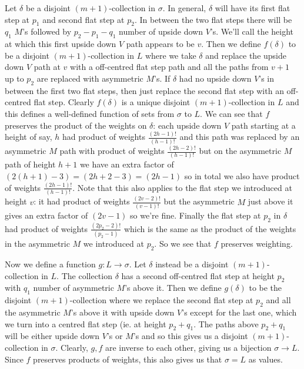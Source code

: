 \documentclass[11pt]{article}
\theoremstyle{definition}
\theoremstyle{definition}
\theoremstyle{plain}
\theoremstyle{plain}
\theoremstyle{plain}
\theoremstyle{definition}
\begin{document}
Let $\delta$ be a disjoint $(m+1)$-collection in $\sigma$. In general, $\delta$ will have its first flat step at $p_1$ and second flat step at $p_2$. In between the two flat steps there will be $q_1$ $M$'s followed by $p_2-p_1-q_1$ number of upside down $V$'s. We'll call the height at which this first upside down $V$ path appears to be $v$. Then we define $f(\delta)$ to be a disjoint $(m+1)$-collection in $L$ where we take $\delta$ and replace the upside down $V$ path at $v$ with a off-centred flat step path and all the paths from $v+1$ up to $p_2$ are replaced with asymmetric $M$'s. If $\delta$ had no upside down $V$'s in between the first two flat steps, then just replace the second flat step with an off-centred flat step. Clearly $f(\delta)$ is a unique disjoint $(m+1)$-collection in $L$ and this defines a well-defined function of sets from $\sigma$ to $L$. We can see that $f$ preserves the product of the weights on $\delta$: each upside down $V$ path starting at a height of say, $h$ had product of weights $\frac{(2h-1)!}{(h-1)!}$ and this path was replaced by an asymmetric $M$ path with product of weights $\frac{(2h-2)!}{(h-1)!}$ but on the asymmetric $M$ path of height $h+1$ we have an extra factor of $(2(h+1)-3) = (2h+2-3) = (2h-1)$ so in total we also have product of weights $\frac{(2h-1)!}{(h-1)!}$. Note that this also applies to the flat step we introduced at height $v$: it had product of weights $\frac{(2v-2)!}{(v-1)!}$ but the asymmetric $M$ just above it gives an extra factor of $(2v-1)$ so we're fine. Finally the flat step at $p_2$ in $\delta$ had product of weights $\frac{(2p_2-2)!}{(p_2-1)}$ which is the same as the product of the weights in the asymmetric $M$ we introduced at $p_2$. So we see that $f$ preserves weighting.

Now we define a function $g:L\to\sigma$. Let $\delta$ instead be a disjoint $(m+1)$-collection in $L$. The collection $\delta$ has a second off-centred flat step at height $p_2$ with $q_1$ number of asymmetric $M$'s above it. Then we define $g(\delta)$ to be the disjoint $(m+1)$-collection where we replace the second flat step at $p_2$ and all the asymmetric $M$'s above it with upside down $V$'s except for the last one, which we turn into a centred flat step (ie. at height $p_2+q_1$. The paths above $p_2+q_1$ will be either upside down $V$'s or $M$'s and so this gives us a disjoint $(m+1)$-collection in $\sigma$. Clearly, $g,f$ are inverse to each other, giving us a bijection $\sigma\to L$. Since $f$ preserves products of weights, this also gives us that $\sigma = L$ as values.
\end{document}
